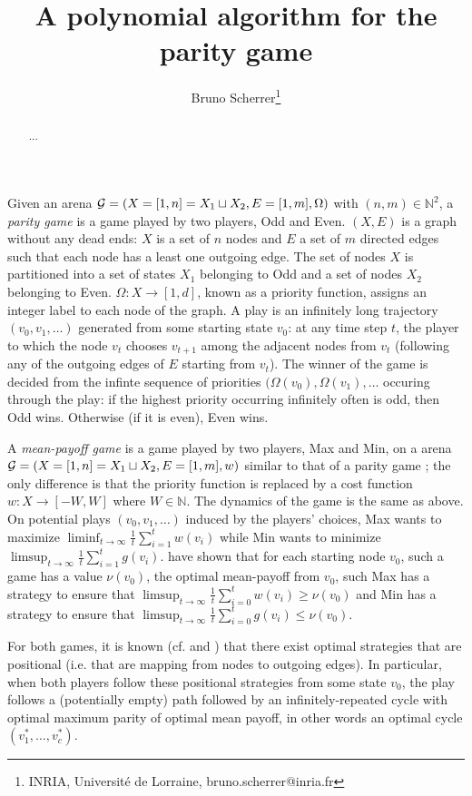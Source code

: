 \documentclass{article}
\title{A polynomial algorithm for the parity game}
\author{Bruno Scherrer\footnote{INRIA, Universit\'e de Lorraine, bruno.scherrer@inria.fr}}
\def\N{\mathbb N}
\def\G{{\cal G}}
\begin{document}
\maketitle

\begin{abstract}
  ...
\end{abstract}


Given an arena $\G=(X=[1,n]=X_1 \sqcup X_2,E=[1,m],\Omega)$ with $(n,m) \in \N^2$, a \emph{parity game} is a game played by two players, Odd and Even.
$(X,E)$ is a graph without any dead ends: $X$ is a set of $n$ nodes and $E$ a set of $m$ directed edges such that each node has a least one outgoing edge. 
The set of nodes  $X$ is partitioned into a set of states $X_1$ belonging to Odd and a set of nodes $X_2$ belonging to Even. $\Omega:X \to [1,d]$, known as a priority function, assigns an integer label to each node of the graph.
A play is an infinitely long trajectory $(v_0,v_1,\dots)$ generated from some starting state $v_0$: at any time step $t$, the player to which the node $v_t$ chooses $v_{t+1}$ among the adjacent nodes from $v_t$ (following any of the outgoing edges of $E$ starting from $v_t$). The winner of the game is decided from the infinte sequence of priorities $(\Omega(v_0),\Omega(v_1),\dots$ occuring through the play: if the highest priority occurring infinitely often is odd, then Odd wins. Otherwise (if it is even), Even wins. 

A \emph{mean-payoff game} is a game played by two players, Max and Min, on a arena $\G=(X=[1,n]=X_1 \sqcup X_2, E=[1,m],w)$ similar to that of a parity game ; the only difference is that the priority function is replaced by a cost function $w:X \to [-W,W]$ where $W \in \N$. The dynamics of the game is the same as above. On potential plays $(v_0,v_1,\dots)$ induced by the players' choices, Max wants to maximize $\liminf_{t \to \infty}\frac{1}{t} \sum_{i=1}^t w(v_i)$ while Min wants to minimize $\limsup_{t \to \infty}\frac{1}{t} \sum_{i=1}^t g(v_i)$. \citet{ehrenfeucht79} have shown that for each starting node $v_0$,  such a game has a value $\nu(v_0)$, the optimal mean-payoff from $v_0$, such Max has a strategy to ensure that $\limsup_{t \to \infty}\frac{1}{t} \sum_{i=0}^t w(v_i) \ge \nu(v_0)$ and Min has a strategy to ensure that $\limsup_{t \to \infty}\frac{1}{t} \sum_{i=0}^t g(v_i) \le \nu(v_0)$.

For both games, it is known (cf. \citet{zielonka98} and \citet{ehrenfeucht79}) that there exist optimal strategies that are positional (i.e. that are mapping from nodes to outgoing edges). In particular, when both players follow these positional strategies from some state $v_0$, the play follows a (potentially empty) path followed by an infinitely-repeated cycle with optimal maximum parity of optimal mean payoff, in other words an optimal cycle $(v^*_1,\dots,v^*_c)$.
\end{document}
